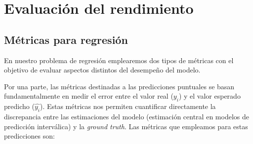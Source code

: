 



\FloatBarrier




\section{Evaluación del rendimiento}


\subsection{Métricas para regresión}

En nuestro problema de regresión emplearemos dos tipos de métricas con el objetivo de evaluar aspectos distintos del desempeño del modelo.

Por una parte, las métricas destinadas a las predicciones puntuales se basan fundamentalmente en medir el error entre el valor real ($y_i$) y el valor esperado predicho ($\hat{y_i}$). Estas métricas nos permiten cuantificar directamente la discrepancia entre las estimaciones del modelo (estimación central en modelos de predicción interválica) y la \textit{ground truth}. Las métricas que empleamos para estas predicciones son:

